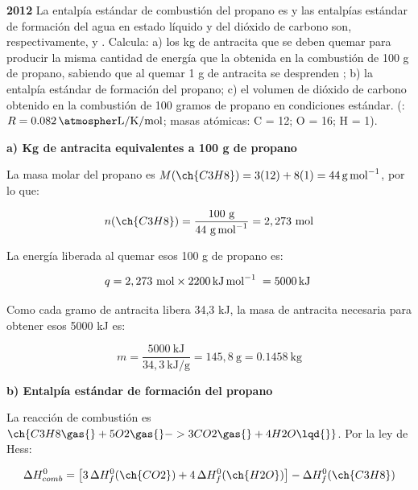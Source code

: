 \begin{exerciseEVAU}
    \textbf{2012} La entalpía estándar de combustión del propano es  y las entalpías estándar de formación del agua en estado líquido y del dióxido de carbono son, respectivamente,  y . Calcula: a) los kg de antracita que se deben quemar para producir la misma cantidad de energía que la obtenida en la combustión de 100 g de propano, sabiendo que al quemar 1 g de antracita se desprenden ; b) la entalpía estándar de formación del propano; c) el volumen de dióxido de carbono obtenido en la combustión de 100 gramos
    de propano en condiciones estándar. (\datos{}: \(R = \ctegases\); masas atómicas: C = 12; O = 16; H = 1).

    \begin{solu}

        \textbf{a) Kg de antracita equivalentes a 100 g de propano}

        La masa molar del propano es \(M(\ch{C3H8}) = 3(12) + 8(1) = \SI{44}{\gram\per\mole}\), por lo que:

        \begin{equation*}
            n(\ch{C3H8}) = \dfrac{100 \ \si{\gram}}{44 \ \si{\gram\per\mole}} = 2,273 \ \text{mol}
        \end{equation*}

        La energía liberada al quemar esos 100 g de propano es:

        \begin{equation*}
            q = 2,273 \ \text{mol} \times \energia[kjmol]{2200} = \energia[kj]{5000}
        \end{equation*}

        Como cada gramo de antracita libera 34,3 kJ, la masa de antracita necesaria para obtener esos 5000 kJ es:

        \begin{equation*}
            m = \dfrac{5000 \ \si{\kilo\joule}}{34,3 \ \si{\kilo\joule\per\gram}} = 145,8 \ \si{\gram} = \SI{0.1458}{\kilo\gram}
        \end{equation*}

        \textbf{b) Entalpía estándar de formación del propano}

        La reacción de combustión es \(\ch{C3H8 \gas{} + 5 O2 \gas{} -> 3 CO2 \gas{} + 4 H2O \lqd{}}\). Por la ley de Hess:

        \begin{equation*}
            \Delta H^0_{comb} = \left[ 3\, \Delta H^0_f (\ch{CO2}) + 4\, \Delta H^0_f (\ch{H2O}) \right] - \Delta H^0_f (\ch{C3H8})
        \end{equation*}


\end{solu}
\end{exerciseEVAU}
